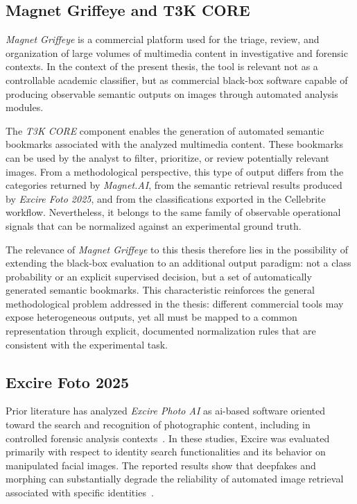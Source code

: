 \subsection{Magnet Griffeye and T3K CORE}
\label{subsec:sota_griffeye_t3k}
\textit{Magnet Griffeye} is a commercial platform used for the triage, review,
and organization of large volumes of multimedia content in investigative and
forensic contexts. In the context of the present thesis, the tool is relevant
not as a controllable academic classifier, but as commercial black-box software
capable of producing observable semantic outputs on images through automated
analysis modules.

The \textit{T3K CORE} component enables the generation of automated semantic
bookmarks associated with the analyzed multimedia content. These bookmarks can
be used by the analyst to filter, prioritize, or review potentially relevant
images. From a methodological perspective, this type of output differs from the
categories returned by \textit{Magnet.AI}, from the semantic retrieval results
produced by \textit{Excire Foto 2025}, and from the classifications exported
in the Cellebrite workflow. Nevertheless, it belongs to the same family of
observable operational signals that can be normalized against an experimental
ground truth.

The relevance of \textit{Magnet Griffeye} to this thesis therefore lies in the
possibility of extending the black-box evaluation to an additional output
paradigm: not a class probability or an explicit supervised decision, but a set
of automatically generated semantic bookmarks. This characteristic reinforces
the general methodological problem addressed in the thesis: different
commercial tools may expose heterogeneous outputs, yet all must be mapped to a
common representation through explicit, documented normalization rules that are
consistent with the experimental task.


\subsection{Excire Foto 2025}
\label{subsec:sota_excire_foto}
Prior literature has analyzed \textit{Excire Photo AI} as \gls{ai}-based
software oriented toward the search and recognition of photographic content,
including in controlled forensic analysis
contexts~\cite{sanna2024preliminary,sanna2025pixelperfect}. In these studies,
Excire was evaluated primarily with respect to identity search functionalities
and its behavior on manipulated facial images. The reported results show that
deepfakes and morphing can substantially degrade the reliability of automated
image retrieval associated with specific
identities~\cite{sanna2025pixelperfect}.

